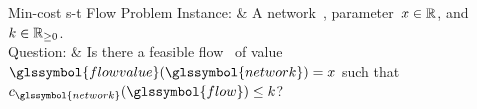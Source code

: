 \begin{problem}[framed]{Min-cost s-t Flow Problem}%
    Instance: & A network~, parameter~$x\in\mathbb{R}$, 
    and~$k\in\mathbb{R}_{\ge0}$.\\
    Question: & Is there a feasible flow~ of
    value~$\glssymbol{flowvalue}(\glssymbol{network}) = x$ such
    that~$c_{\glssymbol{network}}(\glssymbol{flow})\leq k$?
    \label{problems:facts:min-cost-s-t-flow-problem}
\end{problem}%
% 
